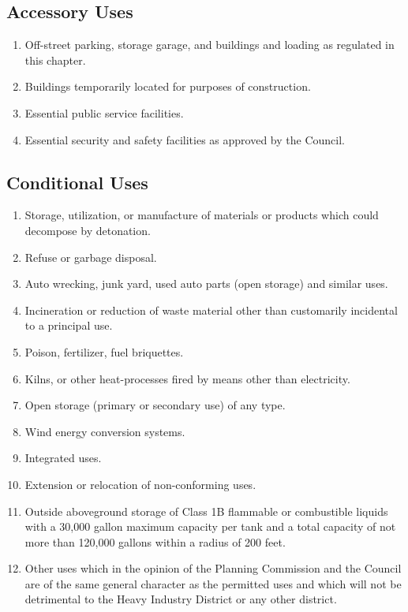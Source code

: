 \subsection{Accessory Uses}
\begin{enumerate}[{\indent}1)]
    \item Off-street parking, storage garage, and buildings and loading as regulated in this chapter.
    \item Buildings temporarily located for purposes of construction.
    \item Essential public service facilities.
    \item Essential security and safety facilities as approved by the Council.
\end{enumerate}
\subsection{Conditional Uses}
\begin{enumerate}[{\indent}1)]
    \item Storage, utilization, or manufacture of materials or products which could decompose by detonation.
    \item Refuse or garbage disposal.
    \item Auto wrecking, junk yard, used auto parts (open storage) and similar uses.
    \item Incineration or reduction of waste material other than customarily incidental to a principal use.
    \item Poison, fertilizer, fuel briquettes.
    \item Kilns, or other heat-processes fired by means other than electricity.
    \item Open storage (primary or secondary use) of any type.
    \item Wind energy conversion systems.
    \item Integrated uses.
    \item Extension or relocation of non-conforming uses.
    \item Outside aboveground storage of Class 1B flammable or combustible liquids with a 30,000 gallon maximum capacity per tank and a total capacity of not more than 120,000 gallons within a radius of 200 feet.
    \item Other uses which in the opinion of the Planning Commission and the Council are of the same general character as the permitted uses and which will not be detrimental to the Heavy Industry District or any other district.
\end{enumerate}
